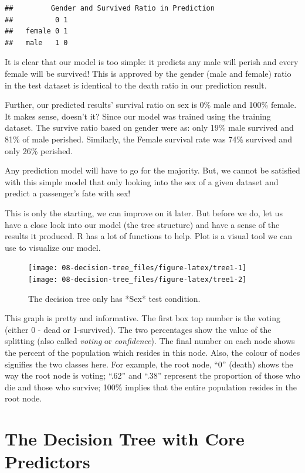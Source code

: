 \documentclass[
]{book}
\begin{document}
\begin{verbatim}
##         Gender and Survived Ratio in Prediction
##          0 1
##   female 0 1
##   male   1 0
\end{verbatim}

It is clear that our model is too simple: it predicts any male will perish and every female will be survived! This is approved by the gender (male and female) ratio in the test dataset is identical to the death ratio in our prediction result.

Further, our predicted results' survival ratio on sex is 0\% male and 100\% female. It makes sense, doesn't it? Since our model was trained using the training dataset. The survive ratio based on gender were as: only 19\% male survived and 81\% of male perished. Similarly, the Female survival rate was 74\% survived and only 26\% perished.

Any prediction model will have to go for the majority. But, we cannot be satisfied with this simple model that only looking into the sex of a given dataset and predict a passenger's fate with sex!

This is only the starting, we can improve on it later. But before we do, let us have a close look into our model (the tree structure) and have a sense of the results it produced. R has a lot of functions to help. Plot is a visual tool we can use to visualize our model.

\begin{figure}

{\centering \texttt{[image: 08-decision-tree\_files/figure-latex/tree1-1]} \texttt{[image: 08-decision-tree\_files/figure-latex/tree1-2]} 

}

\caption{The decision tree only has *Sex* test condition.}\label{fig:tree1}
\end{figure}

This graph is pretty and informative. The first box top number is the voting (either 0 - dead or 1-survived). The two percentages show the value of the splitting (also called \emph{voting} or \emph{confidence}). The final number on each node shows the percent of the population which resides in this node. Also, the colour of nodes signifies the two classes here. For example, the root node, ``0'' (death) shows the way the root node is voting; ``.62'' and ``.38'' represent the proportion of those who die and those who survive; 100\% implies that the entire population resides in the root node.

\hypertarget{the-decision-tree-with-core-predictors}{%
\section{The Decision Tree with Core Predictors}\label{the-decision-tree-with-core-predictors}}
\end{document}
